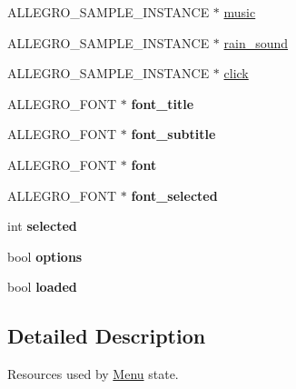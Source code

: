 \begin{DoxyCompactItemize}
\item 
\-A\-L\-L\-E\-G\-R\-O\-\_\-\-S\-A\-M\-P\-L\-E\-\_\-\-I\-N\-S\-T\-A\-N\-C\-E $\ast$ \hyperlink{structMenu_a7b8c42bd64118eb18dceafbd9ac8b3d5}{music}
\item 
\-A\-L\-L\-E\-G\-R\-O\-\_\-\-S\-A\-M\-P\-L\-E\-\_\-\-I\-N\-S\-T\-A\-N\-C\-E $\ast$ \hyperlink{structMenu_a31b58f4005206ba8ecc4b6f40223295f}{rain\-\_\-sound}
\item 
\-A\-L\-L\-E\-G\-R\-O\-\_\-\-S\-A\-M\-P\-L\-E\-\_\-\-I\-N\-S\-T\-A\-N\-C\-E $\ast$ \hyperlink{structMenu_a8f8e8b511a64f03e71259dde1a7bf6f2}{click}
\item 
\hypertarget{structMenu_aac0297cac51099ec75020a510a6dcbb3}{\-A\-L\-L\-E\-G\-R\-O\-\_\-\-F\-O\-N\-T $\ast$ {\bfseries font\-\_\-title}}\label{structMenu_aac0297cac51099ec75020a510a6dcbb3}

\item 
\hypertarget{structMenu_a18d7377e798bac336e55e253243d4e13}{\-A\-L\-L\-E\-G\-R\-O\-\_\-\-F\-O\-N\-T $\ast$ {\bfseries font\-\_\-subtitle}}\label{structMenu_a18d7377e798bac336e55e253243d4e13}

\item 
\hypertarget{structMenu_aa4e0229cb315ef9e0ea90263b26a37f8}{\-A\-L\-L\-E\-G\-R\-O\-\_\-\-F\-O\-N\-T $\ast$ {\bfseries font}}\label{structMenu_aa4e0229cb315ef9e0ea90263b26a37f8}

\item 
\hypertarget{structMenu_a577ad17dfddafaae41dde63ca7970003}{\-A\-L\-L\-E\-G\-R\-O\-\_\-\-F\-O\-N\-T $\ast$ {\bfseries font\-\_\-selected}}\label{structMenu_a577ad17dfddafaae41dde63ca7970003}

\item 
\hypertarget{structMenu_a608e2768a5458057048bf1c7ab9a81aa}{int {\bfseries selected}}\label{structMenu_a608e2768a5458057048bf1c7ab9a81aa}

\item 
\hypertarget{structMenu_a239080567caece4982b2edd716c57223}{bool {\bfseries options}}\label{structMenu_a239080567caece4982b2edd716c57223}

\item 
\hypertarget{structMenu_afd245b822f2805677609fc0f78ee59ac}{bool {\bfseries loaded}}\label{structMenu_afd245b822f2805677609fc0f78ee59ac}

\end{DoxyCompactItemize}


\subsection{\-Detailed \-Description}
\-Resources used by \hyperlink{structMenu}{\-Menu} state. 

